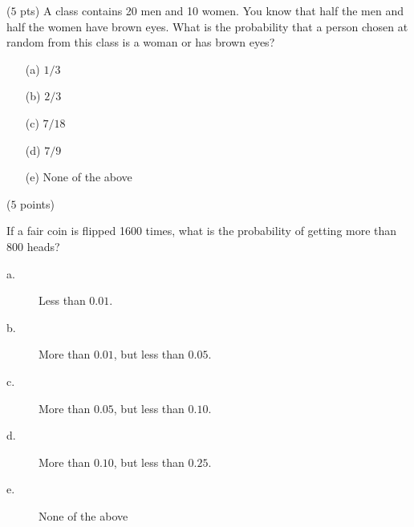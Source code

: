 \documentclass[reqno,letterpaper, onsided,10pt]{amsart}
\theoremstyle{definition}
\newcommand{\sol}[1]{\par\noindent{\bf Solution:} #1}
\renewcommand{\sol}[1]{}
\begin{document}
\medskip

\begin{problem} ($5$ pts)  %
  A class contains 20 men and 10 women. You know that half the men and
  half the women have brown eyes.  What is the probability that a
  person chosen at random from this class is a woman or has brown
  eyes?
\begin{itemize}
\item[(a)] $1/3$
\vskip0.1cm
\item[(b)] $2/3$
\vskip0.1cm
\item[(c)] $7/18$
\vskip0.1cm
\item[(d)] $7/9$
\vskip0.1cm
\item[(e)] None of the above
\end{itemize}
\end{problem}

\sol{
 {\bf (b)}\\
Let
\begin{equation}%
    \nonumber
    \begin{split}
      W & : = \{\text{the chosen person is a woman}\},\\
      B & : = \{\text{the chosen person has brown eyes}\}.\\
    \end{split}
\end{equation}
Then, we need to calculate the probability
\begin{equation}%
    \nonumber
    \begin{split}
      \PP[W \cup B] = \PP[W] + \PP[B] - \PP[W \cap B] = \frac{1}{3} +
      \frac{1}{2} - \frac{1}{6} = \frac{2 + 3 - 1}{6} = \frac{4}{6} =
      \frac{2}{3}\, .
    \end{split}
\end{equation}
}

\medskip

\begin{problem} ($5$ points) %

  If a fair coin is flipped 1600 times, what is the probability of
  getting more than 800 heads?

\begin{description}
\item[a.] Less than $0.01$.
\item[b.] More than $0.01$, but less than $0.05$.
\item[c.] More than $0.05$, but less than $0.10$.
\item[d.] More than $0.10$, but less than $0.25$.
\item[e.] None of the above
\end{description}
\end{problem}

\sol{{\bf e.}\\

}

\medskip
\end{document}
